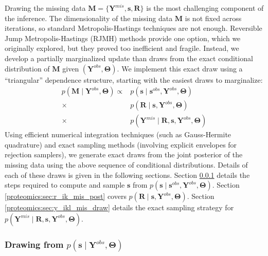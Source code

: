 Drawing the missing data $\mathbf{M}=\{\mathbf{Y}^{mis},\mathbf{s},\mathbf{R}\}$ is the most challenging component of the inference.
The dimensionality of the missing data $\mathbf{M}$ is not fixed across iterations, so standard Metropolis-Hastings techniques are not enough.
Reversible Jump Metropolis-Hastings (RJMH) methods provide one option, which we originally explored, but they proved too inefficient and fragile.
Instead, we develop a partially marginalized update than draws from the exact conditional distribution of $\bm M$ given $(\bm Y^{obs}, \bm \Theta)$.
We implement this exact draw using a ``triangular'' dependence structure, starting with the easiest draws to marginalize:
%
\begin{align}
p( \bm M \mid \bm{Y}^{obs}, \bm{\Theta}) \propto & p(\bm s \mid \bm{s}^{obs}, \bm {Y}^{obs}, \bm{\Theta}) \\
\nonumber
 \times & p(\bm{R} \mid \bm s, \bm{Y}^{obs}, \bm{\Theta}) \\
\nonumber
 \times & p(\bm{Y}^{mis} \mid \bm{R}, \bm{s}, \bm{Y}^{obs}, \bm{\Theta})
\end{align}
%
Using efficient numerical integration techniques (such as Gauss-Hermite quadrature) and exact sampling methods (involving explicit envelopes for rejection samplers), we generate exact draws from the joint posterior of the missing data using the above sequence of conditional distributions.
Details of each of these draws is given in the following sections.
Section \ref{proteomics:sc:draw_s_ik_mis} details the steps required to compute and sample $\bm s$ from $p(\bm s \mid \bm{s}^{obs}, \bm {Y}^{obs}, \bm{\Theta})$.
Section \ref{proteomics:sec:r_ik_mis_post} covers $p(\bm{R} \mid \bm s, \bm{Y}^{obs}, \bm{\Theta})$.
Section \ref{proteomics:sec:y_ikl_mis_draw} details the exact sampling strategy for $p(\bm{Y}^{mis} \mid \bm{R}, \bm{s}, \bm{Y}^{obs}, \bm{\Theta})$.

\subsubsection{Drawing from $p(\bm s \mid \bm {Y}^{obs}, \bm{\Theta})$} \label{proteomics:sc:draw_s_ik_mis} 


